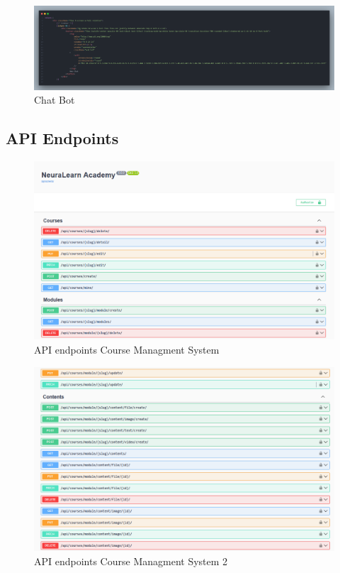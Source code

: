 \begin{figure}[h!]
	\centering
	\includegraphics[max height=\textheight,max width=\textwidth]{figures/srccode/Chat Bot 2.png}
	\caption{Chat Bot}
\end{figure}

\FloatBarrier
\subsection{API Endpoints}
	
\begin{figure}[h!]
	\centering
	\includegraphics[max height=\textheight,max width=\textwidth]{figures/swagger.png}
	\caption{API endpoints Course Managment System}
\end{figure}
	
\begin{figure}[h!]
	\centering
	\includegraphics[max height=\textheight,max width=\textwidth]{figures/swagger2.png}
	\caption{API endpoints Course Managment System 2}
\end{figure}
	
